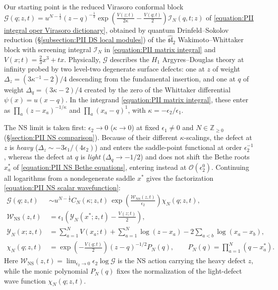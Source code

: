\documentclass[a4paper,11pt]{article}
\numberwithin{equation}{section}
\begin{document}
Our starting point is the reduced Virasoro conformal block
$\mathcal{G}(q;z,t)=u^{N-\frac{1}{2}}(z-q)^{-\frac{1}{2}}
\exp{\left(\frac{V(z;t)}{2\kappa}-\frac{V(q;t)}{2}\right)}
\mathcal{I}_{N}(q,t;z)$ of \eqref{equation:PII integral oper Virasoro dictionary},
obtained by quantum Drinfeld--Sokolov reduction
(\S\ref{subsection:PII DS local modules}) of the
$\widehat{\mathfrak{sl}}_{2}$ Wakimoto--Whittaker block with screening
integral $\mathcal{I}_{N}$ in \eqref{equation:PII matrix integral} and
$V(x;t)=\frac{2}{3}x^{3}+tx$.  Physically, $\mathcal{G}$ describes the
$H_{1}$ Argyres--Douglas theory at infinity probed by two level-two
degenerate surface defects: one at $z$ of weight
$\Delta_{z}=(3\kappa^{-1}-2)/4$ descending from the fundamental
insertion, and one at $q$ of weight $\Delta_{q}=(3\kappa-2)/4$ created
by the zero of the Whittaker differential $\psi(x)=u(x-q)$.  In the
integrand \eqref{equation:PII matrix integral}, these enter as
$\prod_{a}(z-x_{a})^{-1/\kappa}$ and $\prod_{a}(x_{a}-q)^{1}$, with
$\kappa=-\epsilon_{2}/\epsilon_{1}$.

The NS limit is taken first: $\epsilon_{2}\to0$ ($\kappa\to0$) at fixed
$\epsilon_{1}\ne0$ and $N\in\mathbb{Z}_{\geq0}$
(\S\ref{section:PII NS comparison}).  Because of their different
$\kappa$-scalings, the defect at $z$ is \emph{heavy}
($\Delta_{z}\sim -3\epsilon_{1}/(4\epsilon_{2})$) and enters the
saddle-point functional at order $\epsilon_{2}^{-1}$, whereas the
defect at $q$ is \emph{light} ($\Delta_{q}\to-1/2$) and does not shift
the Bethe roots $x_{a}^{*}$ of \eqref{equation:PII NS Bethe equations},
entering instead at $\mathcal{O}(\epsilon_{2}^{0})$.  Continuing all
logarithms from a nondegenerate saddle $x^{*}$ gives the factorization
\eqref{equation:PII NS scalar wavefunction}:
\begin{equation}
	\label{equation:PII chapter7 W chi definitions}
	\begin{aligned}
		\mathcal{G}(q;z,t)
		&\sim u^{N-\frac{1}{2}}C_{N}(\kappa;z,t)\,
		\exp{\left(\frac{\mathcal{W}_{\mathrm{NS}}(z,t)}{\epsilon_{2}}\right)}
		\chi_{N}(q;z,t),\\
		\mathcal{W}_{\mathrm{NS}}(z,t)
		&=\epsilon_{1}\left(\mathcal{Y}_{N}(x^{*};z,t)
		-\frac{V(z;t)}{2}\right),\\
		\mathcal{Y}_{N}(x;z,t)
		&=\sum_{a=1}^{N}V(x_{a};t)
		+\sum_{a=1}^{N}\log{(z-x_{a})}
		-2\sum_{a<b}\log{(x_{a}-x_{b})},\\
		\chi_{N}(q;z,t)
		&=\exp{\left(-\frac{V(q;t)}{2}\right)}
		(z-q)^{-1/2}P_{N}(q),\qquad
		P_{N}(q)=\prod_{a=1}^{N}(q-x_{a}^{*}).
	\end{aligned}
\end{equation}
Here $\mathcal{W}_{\mathrm{NS}}(z,t)=\lim_{\epsilon_{2}\to0}
\epsilon_{2}\log{\mathcal{G}}$ is the NS action carrying the heavy
defect $z$, while the monic polynomial $P_{N}(q)$ fixes the
normalization of the light-defect wave function $\chi_{N}(q;z,t)$.
\end{document}
